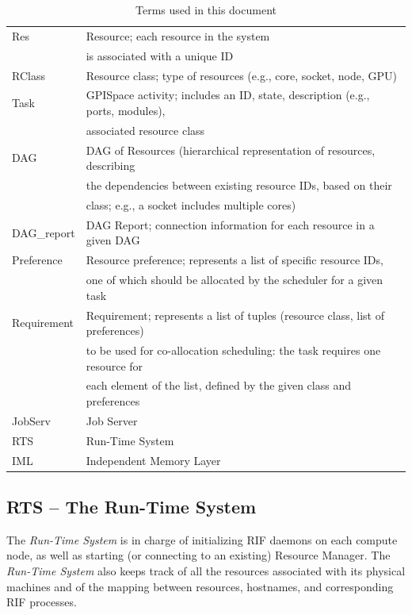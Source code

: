\documentclass[10pt]{article}
\newcommand{\rts}{RTS\xspace}
\newcommand{\iml}{IML\xspace}
\newcommand{\rdag}{DAG\xspace}
\newcommand{\rdagrep}{DAG\_report\xspace}
\newcommand{\js}{JobServ\xspace}
\newcommand{\task}{Task\xspace}
\newcommand{\res}{Res\xspace}
\newcommand{\rc}{RClass\xspace}
\newcommand{\pref}{Preference\xspace}
\newcommand{\req}{Requirement\xspace}
\begin{document}
\begin{table}[ht]
    \centering
    \caption{Terms used in this document}
    \label{tab:terms}
    \bgroup
    \setlength{\tabcolsep}{2em}
    \begin{tabular}{ll}
        \toprule
        \res & Resource; each resource in the system \\ 
                        & is associated with a unique ID \\
        \rc & Resource class; type of resources (e.g., core, socket, node, GPU)\\
        \task & GPISpace activity; includes an ID, state, description (e.g., ports, modules), \\
                        & associated resource class \\
        \rdag & DAG of Resources (hierarchical representation of resources, describing \\
                        & the dependencies between existing resource IDs, based on their \\
                        & class; e.g., a socket includes multiple cores) \\
        \rdagrep &  DAG Report; connection information for each resource in a given DAG \\
        \pref & Resource preference; represents a list of specific resource IDs, \\
                        & one of which should be  allocated by the scheduler for a given task \\
        \req  & Requirement; represents a list of tuples (resource class, list of preferences) \\   
                        & to be used for co-allocation scheduling: the task requires one resource for \\
                        & each element of the list, defined by the given class and preferences  \\ 
        \midrule
        \js & Job Server \\
        \rts & Run-Time System \\
        \iml & Independent Memory Layer \\
        \bottomrule
    \end{tabular}
    \egroup
\end{table}
%

\subsection{RTS -- The Run-Time System}
The \emph{Run-Time System} is in charge of initializing RIF daemons on each
compute node, as well as starting (or connecting to an existing) Resource
Manager.
The \emph{Run-Time System} also keeps track of all the resources associated with
its physical machines and of the mapping between resources, hostnames, and
corresponding RIF processes.
\end{document}
